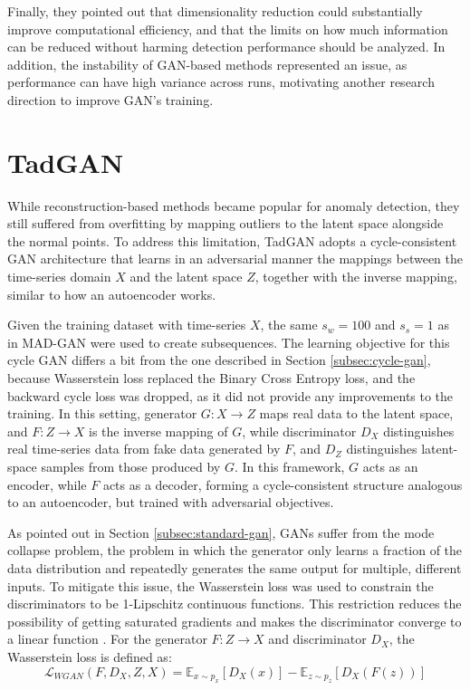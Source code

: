 Finally, they pointed out that dimensionality reduction could substantially improve computational efficiency, and that the limits on how much information can be reduced without harming detection performance should be analyzed. In addition, the instability of GAN-based methods represented an issue, as performance can have high variance across runs, motivating another research direction to improve GAN's training.


\section{TadGAN}
\label{sec:tad-gan}
While reconstruction-based methods became popular for anomaly detection, they still suffered from overfitting by mapping outliers to the latent space alongside the normal points. To address this limitation, TadGAN \cite{geiger2020tadgan} adopts a cycle-consistent GAN architecture \cite{zhu2017cyclegan} that learns in an adversarial manner the mappings between the time-series domain $X$ and the latent space $Z$, together with the inverse mapping, similar to how an autoencoder works.

Given the training dataset with time-series $X$, the same $s_w = 100$ and $s_s = 1$ as in MAD-GAN were used to create subsequences. The learning objective for this cycle GAN differs a bit from the one described in Section \ref{subsec:cycle-gan}, because Wasserstein loss \cite{arjovsky2017wasserstein} replaced the Binary Cross Entropy loss, and the backward cycle loss was dropped, as it did not provide any improvements to the training. In this setting, generator $G:X \to Z$ maps real data to the latent space, and $F: Z \to X$ is the inverse mapping of $G$, while discriminator $D_X$ distinguishes real time-series data from fake data generated by $F$, and $D_Z$ distinguishes latent-space samples from those produced by $G$. In this framework, $G$ acts as an encoder, while $F$ acts as a decoder, forming a cycle-consistent structure analogous to an autoencoder, but trained with adversarial objectives.

As pointed out in Section \ref{subsec:standard-gan}, GANs suffer from the mode collapse problem, the problem in which the generator only learns a fraction of the data distribution and repeatedly generates the same output for multiple, different inputs. To mitigate this issue, the Wasserstein loss \cite{arjovsky2017wasserstein} was used to constrain the discriminators to be 1-Lipschitz continuous functions. This restriction reduces the possibility of getting saturated gradients and makes the discriminator converge to a linear function \cite{arjovsky2017wasserstein}. For the generator $F:Z \to X$ and discriminator $D_X$, the Wasserstein loss is defined as:
$$
\mathcal{L}_{WGAN} (F, D_X, Z, X) = \mathbb{E}_{x \sim p_x} [D_X(x)] - \mathbb{E}_{z \sim p_z} [D_X(F(z))]
$$

